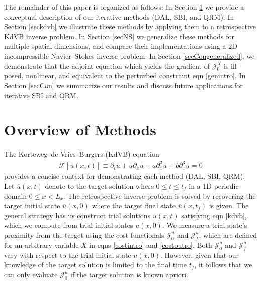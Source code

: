 \documentclass[%
 reprint,
 amsmath,amssymb,
 aps,
 pre,
]{revtex4-2}
\newcommand{\J}{\mathcal{J}}
\newcommand{\Juo}{\mathcal{J}^{u}_0}
\newcommand{\Juf}{\mathcal{J}^{u}_f}
\begin{document}
The remainder of this paper is organized as follows:
In Section \ref{secmethods} we provide a conceptual description of our iterative methods (DAL, SBI, and QRM).
In Section \ref{seckdvb} we illustrate these methods by applying them to a retrospective KdVB inverse problem. 
In Section \ref{secNS} we generalize these methods for multiple spatial dimensions, and compare their implementations using a 2D incompressible Navier--Stokes inverse problem.
In Section \ref{secCongeneralized}, we demonstrate that the adjoint equation which yields the gradient of $\J_0^X$ is ill-posed, nonlinear, and equivalent to the perturbed constraint eqn \ref{genintro}. 
In Section \ref{secCon} we summarize our results and discuss future applications for iterative SBI and QRM.


\section{Overview of Methods}\label{secmethods}

The Korteweg--de Vries--Burgers (KdVB) equation 
\begin{align}
  \mathcal{F}[\overline{u}(x,t)] \equiv \partial_t \overline{u} + \overline{u}\partial_x \overline{u} - a\partial_x^2 \overline{u} + b\partial_x^3 \overline{u} = 0 \label{kdvb}
\end{align}
provides a concise context for demonstrating each method (DAL, SBI, QRM).
Let $\overline{u}(x,t)$ denote to the target solution where $0\leq t\leq t_f$ in a 1D periodic domain $0 \leq x<L_x$.
The retrospective inverse problem is solved by recovering the target initial state $\overline{u}(x,0)$ where the target final state $\overline{u}(x,t_f)$ is given.
The general strategy has us construct trial solutions $u(x,t)$ satisfying eqn \ref{kdvb}, which we compute from trial initial states $u(x,0)$.
We measure a trial state's proximity from the target using the cost functionals $\Juo$ and $\Juf$, which are defined for an arbitrary variable $X$ in eqns \ref{costintro} and \ref{costoutro}.
Both $\Juo$ and $\Juf$ vary with respect to the trial initial state $u(x,0)$.
However, given that our knowledge of the target solution is limited to the final time $t_f$, it follows that we can only evaluate $\Juo$ if the target solution is known apriori.
\end{document}
